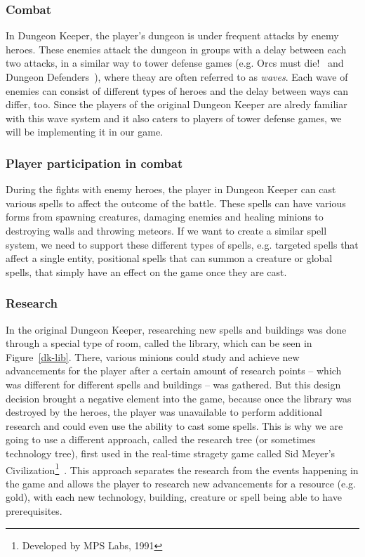 \subsubsection{Combat}

In Dungeon Keeper, the player's dungeon is under frequent attacks by enemy heroes. These enemies attack the dungeon 
in groups with a delay between each two attacks, in a similar way to tower defense games (e.g. Orcs must die!~\cite{OMD} 
and Dungeon Defenders~\cite{DungeonDefenders}), where theay are often referred to as \emph{waves}. Each wave of enemies
can consist of different types of heroes and the delay between ways can differ, too. Since the players of the original
Dungeon Keeper are alredy familiar with this wave system and it also caters to players of tower defense games, we will be
implementing it in our game.

\subsubsection{Player participation in combat}

During the fights with enemy heroes, the player in Dungeon Keeper can cast various spells to affect the outcome of the battle.
These spells can have various forms from spawning creatures, damaging enemies and healing minions to destroying walls and throwing
meteors. If we want to create a similar spell system, we need to support these different types of spells, e.g. targeted spells that
affect a single entity, positional spells that can summon a creature or global spells, that simply have an effect on the game once
they are cast.

\subsubsection{Research}

In the original Dungeon Keeper, researching new spells and buildings was done through a special type of room, called the library,
which can be seen in Figure~\ref{dk-lib}. There,
various minions could study and achieve new advancements for the player after a certain amount of research points -- which was different
for different spells and buildings -- was gathered. But this design decision brought a negative element into the game, because once the
library was destroyed by the heroes, the player was unavailable to perform additional research and could even use the ability to cast
some spells. This is why we are going to use a different approach, called the research tree (or sometimes technology tree), first used
in the real-time stragety game called Sid Meyer's Civilization\footnote{Developed by MPS Labs, 1991}~\cite{ResearchTrees}. This approach 
separates the research from the events happening in the game and allows the player to research new advancements for a resource (e.g. gold),
with each new technology, building, creature or spell being able to have prerequisites.

